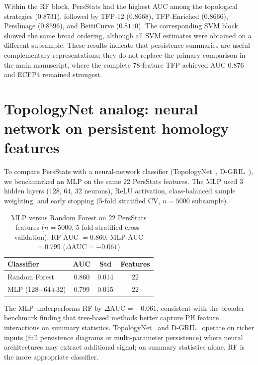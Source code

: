 \documentclass[11pt,a4paper]{article}
\begin{document}
Within the RF block, PersStats had the highest AUC among the topological strategies ($\num{0.8731}$), followed by TFP-12 ($\num{0.8668}$), TFP-Enriched ($\num{0.8666}$), PersImage ($\num{0.8596}$), and BettiCurve ($\num{0.8110}$). The corresponding SVM block showed the same broad ordering, although all SVM estimates were obtained on a different subsample. These results indicate that persistence summaries are useful complementary representations; they do not replace the primary comparison in the main manuscript, where the complete 78-feature TFP achieved AUC $\num{0.876}$ and ECFP4 remained strongest.


\section{TopologyNet analog: neural network on persistent homology features}

To compare PersStats with a neural-network classifier (TopologyNet~\citep{topologynet_2018}, D-GRIL~\citep{dgril_2026}), we benchmarked an MLP on the same 22 PersStats features. The MLP used 3 hidden layers (128, 64, 32 neurons), ReLU activation, class-balanced sample weighting, and early stopping (5-fold stratified CV, $n = \num{5000}$ subsample).

\begin{table}[htbp]
\centering
\caption{MLP versus Random Forest on 22 PersStats features ($n=\num{5000}$, 5-fold stratified cross-validation). RF AUC $= \num{0.860}$; MLP AUC $= \num{0.799}$ ($\Delta\mathrm{AUC}=-\num{0.061}$).}
\label{tab:topologynet_analog}
\begin{tabularx}{\textwidth}{l S[table-format=1.4] S[table-format=1.4] S[table-format=1.0]}
\toprule
{Classifier} & {AUC} & {Std} & {Features} \\
\midrule
Random Forest & 0.860 & 0.014 & 22 \\
MLP (128+64+32) & 0.799 & 0.015 & 22 \\
\bottomrule
\end{tabularx}
\end{table}

The MLP underperforms RF by $\Delta$AUC = $-0.061$, consistent with the broader benchmark finding that tree-based methods better capture PH feature interactions on summary statistics. TopologyNet~\citep{topologynet_2018} and D-GRIL~\citep{dgril_2026} operate on richer inputs (full persistence diagrams or multi-parameter persistence) where neural architectures may extract additional signal; on summary statistics alone, RF is the more appropriate classifier.
\end{document}
